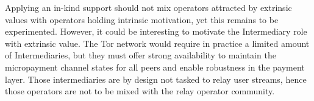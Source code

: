 Applying an in-kind support should not mix operators attracted by extrinsic 
values with operators holding intrinsic motivation, yet this remains to be 
experimented. However, it could be interesting to motivate the Intermediary 
role with extrinsic value. The Tor network would require in practice a 
limited amount of Intermediaries, but they must offer strong availability to 
maintain the micropayment channel states for all peers and enable 
robustness in the payment layer. 
Those intermediaries are by design not tasked 
to relay user streams, hence those operators are not to be mixed with the relay 
operator community.

